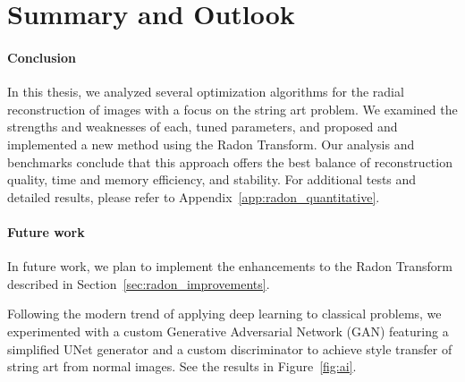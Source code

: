 \chapter{Summary and Outlook}

\subsubsection{Conclusion}

In this thesis, we analyzed several optimization algorithms for the radial reconstruction of images  with a focus on the string art problem. We examined the strengths and weaknesses of each, tuned parameters, and proposed and implemented a new method using the Radon Transform. Our analysis and benchmarks conclude that this approach offers the best balance of reconstruction quality, time and memory efficiency, and stability. For additional tests and detailed results, please refer to Appendix~\ref{app:radon_quantitative}.

\subsubsection{Future work}

In future work, we plan to implement the enhancements to the Radon Transform described in Section~\ref{sec:radon_improvements}. 

Following the modern trend of applying deep learning to classical problems, we experimented with a custom Generative Adversarial Network (GAN) featuring a simplified UNet generator and a custom discriminator to achieve style transfer of string art from normal images. See the results in Figure~\ref{fig:ai}.

